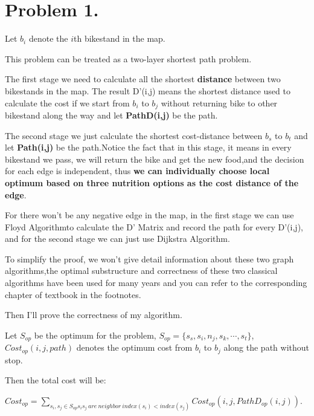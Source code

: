 \documentclass[oneside]{homework} %
\begin{document}
\maketitle
\newpage

\section*{Problem 1.}
Let $b_{i}$ denote the $i$th bikestand in the map.

This problem can be treated as a two-layer shortest path problem. 

The first stage we need to calculate all the shortest \textbf{distance} between two bikestands in the map. The result D'(i,j) means the shortest distance used to calculate the cost if we start from $b_{i}$ to $b_{j}$ without returning bike to other bikestand along the way and let \textbf{PathD(i,j)} be the path. 

The second stage we just calculate the shortest cost-distance between $b_{s}$ to $b_{t}$ and let \textbf{Path(i,j)} be the path.Notice the fact that in this stage, it means in every bikestand we pass, we will return the bike and get the new food,and the decision for each edge is independent, thus \textbf{we can individually choose local optimum based on three nutrition options as the cost distance of the edge}.

For there won't be any negative edge in the map, in the first stage we can use Floyd Algorithm\footnotemark[1]to calculate the D' Matrix and record the path for every D'(i,j), and for the second stage we can just use Dijkstra Algorithm\footnotemark[2]. 

To simplify the proof, we won't give detail information about these two graph algorithms,the optimal substructure and correctness of these two classical algorithms have been used for many years and you can refer to the corresponding chapter of textbook in the footnotes.

Then I'll prove the correctness of my algorithm.

Let $S_{op}$ be the optimum for the problem, $S_{op} = \{s_{s},s_{i},n_{j},s_{k}, \cdots ,s_{t} \}$, $Cost_{op}(i,j,path)$ denotes the optimum cost from $b_{i}$ to $b_{j}$ along the path without stop.  

Then the total cost will be:

 $Cost_{op} = \sum_{s_{i},s_{j} \in S_{op} s_{i}s_{j}~are~neighbor ~ index(s_{i}) < index(s_{j}) }Cost_{op}(i,j,PathD_{op}(i,j))$.
\end{document}

